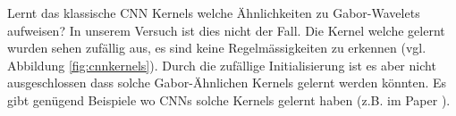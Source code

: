 Lernt das klassische CNN Kernels welche Ähnlichkeiten zu Gabor-Wavelets aufweisen?
In unserem Versuch ist dies nicht der Fall.
Die Kernel welche gelernt wurden sehen zufällig aus, es sind keine Regelmässigkeiten zu erkennen (vgl. Abbildung \ref{fig:cnnkernels}). %
Durch die zufällige Initialisierung ist es aber nicht ausgeschlossen dass solche Gabor-Ähnlichen Kernels gelernt werden könnten.
Es gibt genügend Beispiele wo CNNs solche Kernels gelernt haben (z.B. im Paper \cite{paper:kernel}). %
